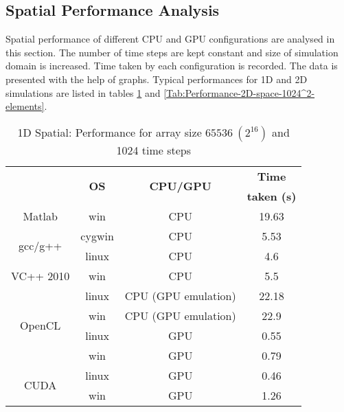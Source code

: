 \subsection{Spatial Performance Analysis}
Spatial performance of different CPU and GPU configurations are analysed in this section. The number of time steps are kept constant and size of simulation domain is increased. Time taken by each configuration is recorded. The data is presented with the help of graphs. Typical performances for 1D and 2D simulations are listed in tables \ref{Tab:Performance-1D-space-65536-elements} and \ref{Tab:Performance-2D-space-1024^2-elements}.
\begin{table}[H]
\begin{center}
\vspace{0.3cm}
	\begin{tabular}{cccc}
	\hline \hline
		\rule{0pt}{2.6ex} & \multirow{2}{*}{\textbf{OS}} & \multirow{2}{*}{\textbf{CPU/GPU}}  & \textbf{Time}\\
		& &  & \textbf{taken (s)}\\
		\hline
		Matlab \rule{0pt}{2.6ex} & win & CPU &19.63\\
		\hline
		\multirow{2}{*}{gcc/g++} \rule{0pt}{2.6ex} & cygwin & CPU &5.53\\
		& linux & CPU &4.6\\
		\hline
		VC++ 2010 \rule{0pt}{2.6ex} & win & CPU &5.5\\
		\hline
		\multirow{4}{*}{OpenCL} \rule{0pt}{2.6ex} & linux & CPU (GPU emulation) &22.18\\
		& win & CPU (GPU emulation) &22.9\\
		& linux & GPU &0.55\\
		& win & GPU &0.79\\
		\hline
		\multirow{2}{*}{CUDA} \rule{0pt}{2.6ex} & linux & GPU &0.46\\
		& win & GPU &1.26\\
	\hline \hline
	\end{tabular}
\end{center}
\caption{1D Spatial: Performance for array size $65536~(2^{16})$ and 1024 time steps}
\label{Tab:Performance-1D-space-65536-elements}
\end{table}

